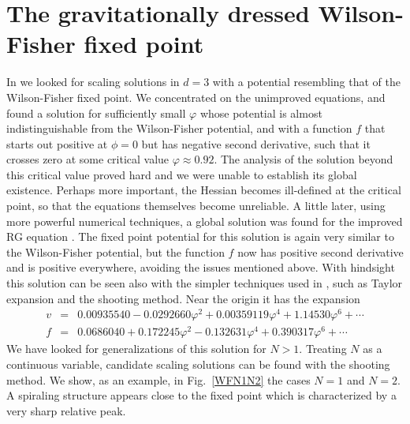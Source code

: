 \documentclass[11pt]{book} %
\newcommand{\bea}{\begin{eqnarray}}
\newcommand{\eea}{\end{eqnarray}}
\begin{document}
\section{The gravitationally dressed Wilson-Fisher fixed point}


In \cite{pv1} we looked for scaling solutions in $d=3$
with a potential resembling that of the Wilson-Fisher fixed point.
We concentrated on the unimproved equations,
and found a solution for sufficiently small $\varphi$
whose potential is almost indistinguishable from the
Wilson-Fisher potential, and with a function $f$
that starts out positive at $\phi=0$ but has negative
second derivative, such that it crosses zero at
some critical value $\varphi\approx 0.92$.
The analysis of the solution beyond this critical value
proved hard and we were unable to establish its global existence.
Perhaps more important, the Hessian becomes ill-defined at the
critical point, so that the equations themselves become unreliable.
A little later, using more powerful numerical techniques,
a global solution was found for the improved RG equation \cite{bk}.
The fixed point potential for this solution is again
very similar to the Wilson-Fisher potential,
but the function $f$ now has positive second derivative
and is positive everywhere, avoiding the issues mentioned above.
With hindsight this solution can be seen also with the
simpler techniques used in \cite{pv1}, such as
Taylor expansion and the shooting method.
Near the origin it has the expansion
\bea
v&=&0.00935540-0.0292660 \varphi ^2+0.00359119 \varphi ^4+1.14530 \varphi ^6+\cdots
\nonumber \\
f&=&0.0686040+0.172245 \varphi ^2-0.132631 \varphi ^4+0.390317 \varphi ^6+\cdots
\nonumber
\eea
We have looked for generalizations of this solution for $N>1$.
Treating $N$ as a continuous variable, candidate scaling solutions
can be found with the shooting method.
We show, as an example, in Fig.~\ref{WFN1N2} the cases $N=1$ and $N=2$.
A spiraling structure appears close to the fixed point which is characterized by a very sharp relative peak.
\end{document}
